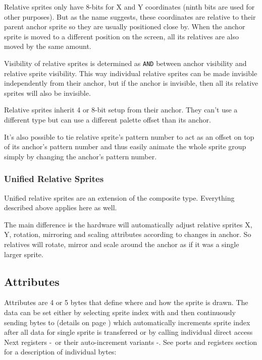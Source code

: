 Relative sprites only have 8-bits for X and Y coordinates (ninth bits are used for other purposes). But as the name suggests, these coordinates are relative to their parent anchor sprite so they are usually positioned close by. When the anchor sprite is moved to a different position on the screen, all its relatives are also moved by the same amount.

Visibility of relative sprites is determined as {\tt AND} between anchor visibility and relative sprite visibility. This way individual relative sprites can be made invisible independently from their anchor, but if the anchor is invisible, then all its relative sprites will also be invisible.

Relative sprites inherit 4 or 8-bit setup from their anchor. They can't use a different type but can use a different palette offset than its anchor.

It's also possible to tie relative sprite's pattern number to act as an offset on top of its anchor's pattern number and thus easily animate the whole sprite group simply by changing the anchor's pattern number.

\subsubsection{Unified Relative Sprites}

Unified relative sprites are an extension of the composite type. Everything described above applies here as well.

The main difference is the hardware will automatically adjust relative sprites X, Y, rotation, mirroring and scaling attributes according to changes in anchor. So relatives will rotate, mirror and scale around the anchor as if it was a single larger sprite.

\subsection{Attributes}

Attributes are 4 or 5 bytes that define where and how the sprite is drawn. The data can be set either by selecting sprite index with  and then continuously sending bytes to  (details on page ) which automatically increments sprite index after all data for single sprite is transferred or by calling individual direct access Next registers -~or their auto-increment variants -. See ports and registers section  for a description of individual bytes:

